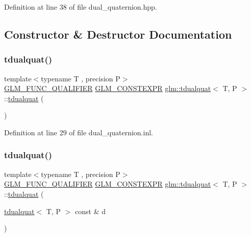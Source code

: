 Definition at line 38 of file dual\+\_\+quaternion.\+hpp.



\subsection{Constructor \& Destructor Documentation}
\mbox{\label{structglm_1_1tdualquat_a4710cde777552996f95958802583dbb6}} 
\subsubsection{\texorpdfstring{tdualquat()}{tdualquat()}\hspace{0.1cm}{\footnotesize\ttfamily [1/12]}}
{\footnotesize\ttfamily template$<$typename T , precision P$>$ \\
\mbox{\hyperlink{setup_8hpp_a33fdea6f91c5f834105f7415e2a64407}{G\+L\+M\+\_\+\+F\+U\+N\+C\+\_\+\+Q\+U\+A\+L\+I\+F\+I\+ER}} \mbox{\hyperlink{setup_8hpp_a08b807947b47031d3a511f03f89645ad}{G\+L\+M\+\_\+\+C\+O\+N\+S\+T\+E\+X\+PR}} \mbox{\hyperlink{structglm_1_1tdualquat}{glm\+::tdualquat}}$<$ T, P $>$\+::\mbox{\hyperlink{structglm_1_1tdualquat}{tdualquat}} (\begin{DoxyParamCaption}{ }\end{DoxyParamCaption})}



Definition at line 29 of file dual\+\_\+quaternion.\+inl.

\mbox{\label{structglm_1_1tdualquat_aaa1e073067ee609264b4943ab4397d62}} 
\subsubsection{\texorpdfstring{tdualquat()}{tdualquat()}\hspace{0.1cm}{\footnotesize\ttfamily [2/12]}}
{\footnotesize\ttfamily template$<$typename T , precision P$>$ \\
\mbox{\hyperlink{setup_8hpp_a33fdea6f91c5f834105f7415e2a64407}{G\+L\+M\+\_\+\+F\+U\+N\+C\+\_\+\+Q\+U\+A\+L\+I\+F\+I\+ER}} \mbox{\hyperlink{setup_8hpp_a08b807947b47031d3a511f03f89645ad}{G\+L\+M\+\_\+\+C\+O\+N\+S\+T\+E\+X\+PR}} \mbox{\hyperlink{structglm_1_1tdualquat}{glm\+::tdualquat}}$<$ T, P $>$\+::\mbox{\hyperlink{structglm_1_1tdualquat}{tdualquat}} (\begin{DoxyParamCaption}\item[{\mbox{\hyperlink{structglm_1_1tdualquat}{tdualquat}}$<$ T, P $>$ const \&}]{d }\end{DoxyParamCaption})}



